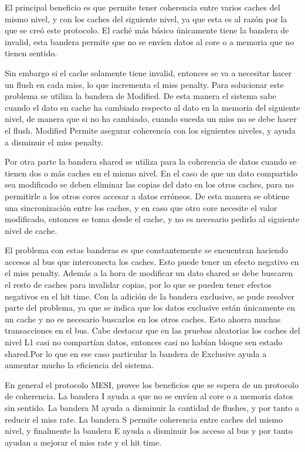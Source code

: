\documentclass {article}
\begin{document}
El principal beneficio es que permite tener coherencia entre varios caches del mismo nivel, y con
los caches del siguiente nivel, ya que esta es al razón por la que se creó este protocolo. El caché
más básico únicamente tiene la bandera de invalid, esta bandera permite que no se envíen datos al
core o a memoria que no tienen sentido.

Sin embargo si el cache solamente tiene invalid, entonces se
va a necesitar hacer un flush en cada miss, lo que incrementa el miss penalty. Para solucionar este
problema se utiliza la bandera de Modified. De esta manera el sistema sabe cuando el dato en cache
ha cambiado respecto al dato en la memoria del siguiente nivel, de manera que si no ha cambiado,
cuando suceda un miss no se debe hacer el flush. Modified Permite asegurar coherencia con los
siguientes niveles, y ayuda a disminuir el miss penalty.

Por otra parte la bandera shared se utiliza para la coherencia de datos cuando se tienen dos o más
caches en el mismo nivel. En el caso de que un dato compartido sea modificado se deben eliminar las
copias del dato en los otros caches, para no permitirle a los otros cores accesar a datos
erróneos. De esta manera se obtiene una sincronización entre los caches, y en caso que otro core
necesite el valor modificado, entonces se toma desde el cache, y no es necesario pedirlo al
siguiente nivel de cache.

El problema con estas banderas es que constantemente se encuentran haciendo accesos al bus que
interconecta los caches. Esto puede tener un efecto negativo en el miss penalty. Además a la hora de
modificar un dato shared se debe buscaren el resto de caches para invalidar copias, por lo que se
pueden tener efectos negativos en el hit time. Con la adición de la bandera exclusive, se pude
resolver parte del problema, ya que se indica que los datos exclusive están únicamente en un cache y
no es necesario buscarlos en los otros caches. Esto ahorra muchas transacciones en el bus. Cabe
destacar que en las pruebas aleatorias los caches del nivel L1 casi no compartían datos, entonces casi
no habían bloque sen estado shared.Por lo que en ese caso particular la bandera de Exclusive ayuda a
aumentar mucho la eficiencia del sistema.

En general el protocolo MESI, provee los beneficios que se espera de un protocolo de coherencia. La bandera I ayuda a que no se envíen al core o a memoria datos sin
sentido. La bandera M ayuda a disminuir la cantidad de flushes, y por tanto a reducir el miss
rate. La bandera S permite coherencia entre caches del mismo nivel, y finalmente la bandera E ayuda
a disminuir los acceso al bus y por tanto ayudan a mejorar el miss rate y el hit time. 
\end{document}
